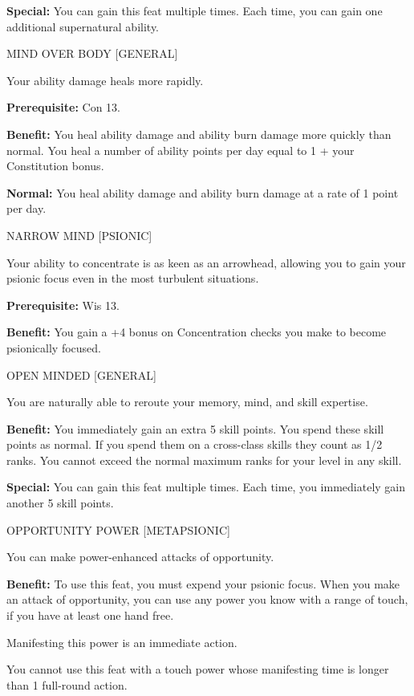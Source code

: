 \documentclass{article}
\begin{document}
\textbf{Special:} You can gain this feat multiple times. Each time, you can gain 
one additional supernatural ability.

\vspace{12pt}
MIND OVER BODY [GENERAL]

Your ability damage heals more rapidly.

\textbf{Prerequisite:} Con 13.

\textbf{Benefit:} You heal ability damage and ability burn damage more quickly 
than normal. You heal a number of ability points per day equal to 1 + your Constitution 
bonus. 

\textbf{Normal:} You heal ability damage and ability burn damage at a rate of 1 
point per day.

\vspace{12pt}
NARROW MIND [PSIONIC]

Your ability to concentrate is as keen as an arrowhead, allowing you to gain your 
psionic focus even in the most turbulent situations.

\textbf{Prerequisite:} Wis 13.

\textbf{Benefit:} You gain a +4 bonus on Concentration checks you make to become 
psionically focused.

\vspace{12pt}
OPEN MINDED [GENERAL]

You are naturally able to reroute your memory, mind, and skill expertise.

\textbf{Benefit:} You immediately gain an extra 5 skill points. You spend these 
skill points as normal. If you spend them on a cross-class skills they count as 
1/2 ranks. You cannot exceed the normal maximum ranks for your level in any skill. 

\textbf{Special:} You can gain this feat multiple times. Each time, you immediately 
gain another 5 skill points.

\vspace{12pt}
OPPORTUNITY POWER [METAPSIONIC]

You can make power-enhanced attacks of opportunity.

\textbf{Benefit:} To use this feat, you must expend your psionic focus. When you 
make an attack of opportunity, you can use any power you know with a range of touch, 
if you have at least one hand free.

Manifesting this power is an immediate action.

You cannot use this feat with a touch power whose manifesting time is longer than 
1 full-round action.
\end{document}
